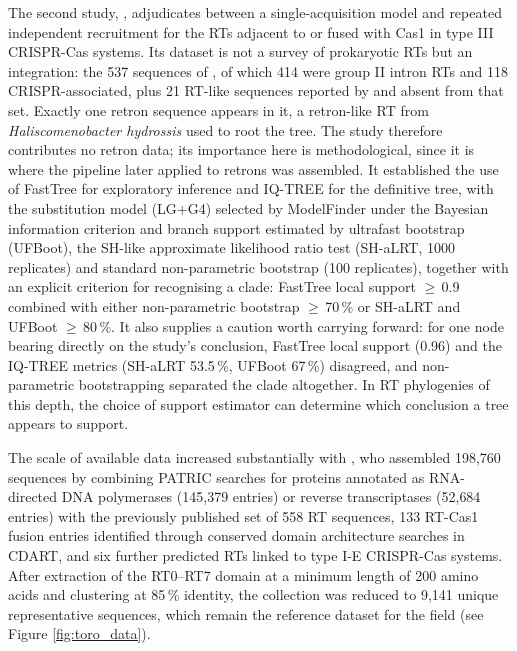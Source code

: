 The second study, \cite{toro2018}, adjudicates between a single-acquisition model
\citep{silas2017} and repeated independent recruitment for the RTs adjacent to or fused with
Cas1 in type III CRISPR-Cas systems. Its dataset is not a survey of prokaryotic RTs but an
integration: the 537 sequences of \cite{toro2017}, of which 414 were group II intron RTs and 118
CRISPR-associated, plus 21 RT-like sequences reported by \cite{silas2017} and absent from that
set. Exactly one retron sequence appears in it, a retron-like RT from \textit{Haliscomenobacter
hydrossis} used to root the tree. The study therefore contributes no retron data; its importance
here is methodological, since it is where the pipeline later applied to retrons was assembled. It
established the use of FastTree for exploratory inference and IQ-TREE for the definitive tree,
with the substitution model (LG+G4) selected by ModelFinder under the Bayesian information
criterion and branch support estimated by ultrafast bootstrap (UFBoot), the SH-like approximate
likelihood ratio test (SH-aLRT, 1000 replicates) and standard non-parametric bootstrap (100
replicates), together with an explicit criterion for recognising a clade: FastTree local support
$\geq$\,0.9 combined with either non-parametric bootstrap $\geq$\,70\,\% or SH-aLRT and UFBoot
$\geq$\,80\,\%. It also supplies a caution worth carrying forward: for one node bearing directly
on the study's conclusion, FastTree local support (0.96) and the IQ-TREE metrics (SH-aLRT
53.5\,\%, UFBoot 67\,\%) disagreed, and non-parametric bootstrapping separated the clade
altogether. In RT phylogenies of this depth, the choice of support estimator can determine which
conclusion a tree appears to support.


The scale of available data increased substantially with \cite{toro2019}, who assembled 198{,}760
sequences by combining PATRIC searches for proteins annotated as RNA-directed DNA polymerases
(145{,}379 entries) or reverse transcriptases (52{,}684 entries) with the previously published set
of 558 RT sequences, 133 RT-Cas1 fusion entries identified through conserved domain architecture
searches in CDART, and six further predicted RTs linked to type I-E CRISPR-Cas systems. After
extraction of the RT0--RT7 domain at a minimum length of 200 amino acids and clustering at 85\,\%
identity, the collection was reduced to 9{,}141 unique representative sequences, which remain the
reference dataset for the field (see Figure \ref{fig:toro_data}).
 
